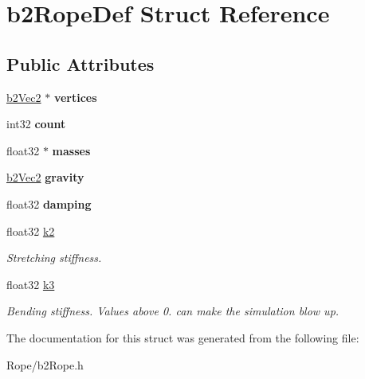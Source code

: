 \hypertarget{structb2RopeDef}{}\section{b2\+Rope\+Def Struct Reference}
\label{structb2RopeDef}
\subsection*{Public Attributes}
\begin{DoxyCompactItemize}
\item 
\mbox{\label{structb2RopeDef_ae18ad98b9796c505ae62ce58fa2f7051}} 
\mbox{\hyperlink{structb2Vec2}{b2\+Vec2}} $\ast$ {\bfseries vertices}
\item 
\mbox{\label{structb2RopeDef_a0c75d4289a807e31f32dc43a2276671f}} 
int32 {\bfseries count}
\item 
\mbox{\label{structb2RopeDef_a78f75cce30ee253062ffa6f5462b36a1}} 
float32 $\ast$ {\bfseries masses}
\item 
\mbox{\label{structb2RopeDef_a90d98969150047662ce835ec1670fb32}} 
\mbox{\hyperlink{structb2Vec2}{b2\+Vec2}} {\bfseries gravity}
\item 
\mbox{\label{structb2RopeDef_a13ad872bb9d4926f3e4e49b7061613cb}} 
float32 {\bfseries damping}
\item 
\mbox{\label{structb2RopeDef_a89de5d2c15afacd41722c76523e33826}} 
float32 \mbox{\hyperlink{structb2RopeDef_a89de5d2c15afacd41722c76523e33826}{k2}}
\begin{DoxyCompactList}\small\item\em Stretching stiffness. \end{DoxyCompactList}\item 
\mbox{\label{structb2RopeDef_a3f4749e0a309b53daf804c75adfb4ba8}} 
float32 \mbox{\hyperlink{structb2RopeDef_a3f4749e0a309b53daf804c75adfb4ba8}{k3}}
\begin{DoxyCompactList}\small\item\em Bending stiffness. Values above 0. can make the simulation blow up. \end{DoxyCompactList}\end{DoxyCompactItemize}


The documentation for this struct was generated from the following file\+:\begin{DoxyCompactItemize}
\item 
Rope/b2\+Rope.\+h\end{DoxyCompactItemize}
